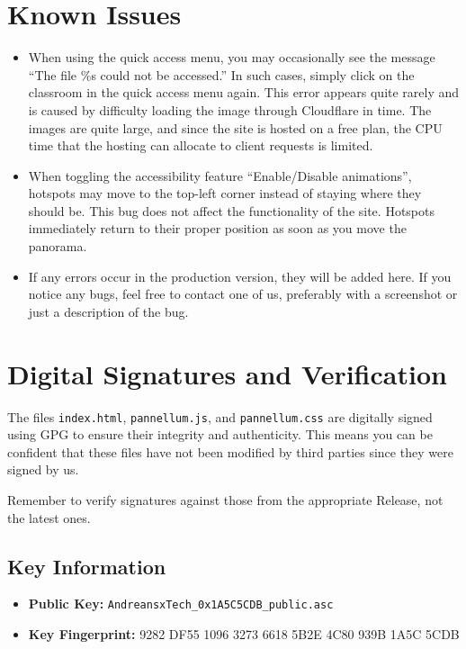 \documentclass[11pt,a4paper]{article}
\begin{document}
\section{Known Issues}
\begin{tcolorbox}[colback=red!5,colframe=red!75!black,title=Known Bugs]
\begin{itemize}[leftmargin=*]
    \item When using the quick access menu, you may occasionally see the message ``The file \%s could not be accessed.'' In such cases, simply click on the classroom in the quick access menu again. This error appears quite rarely and is caused by difficulty loading the image through Cloudflare in time. The images are quite large, and since the site is hosted on a free plan, the CPU time that the hosting can allocate to client requests is limited.
    
    \item When toggling the accessibility feature ``Enable/Disable animations'', hotspots may move to the top-left corner instead of staying where they should be. This bug does not affect the functionality of the site. Hotspots immediately return to their proper position as soon as you move the panorama.
    
    \item If any errors occur in the production version, they will be added here. If you notice any bugs, feel free to contact one of us, preferably with a screenshot or just a description of the bug.
\end{itemize}
\end{tcolorbox}

\section{Digital Signatures and Verification}
The files \texttt{index.html}, \texttt{pannellum.js}, and \texttt{pannellum.css} are digitally signed using GPG to ensure their integrity and authenticity. This means you can be confident that these files have not been modified by third parties since they were signed by us.

Remember to verify signatures against those from the appropriate Release, not the latest ones.

\subsection{Key Information}
\begin{itemize}[leftmargin=*]
    \item \textbf{Public Key:} \texttt{AndreansxTech\_0x1A5C5CDB\_public.asc}
    \item \textbf{Key Fingerprint:} 9282 DF55 1096 3273 6618 5B2E 4C80 939B 1A5C 5CDB
\end{itemize}
\end{document}
